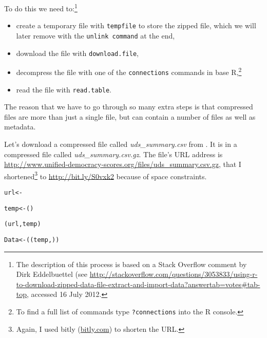 {To do this we need to:\footnote{The description of this process is based on a Stack Overflow comment by Dirk Eddelbuettel (see {\url{http://stackoverflow.com/questions/3053833/using-r-to-download-zipped-data-file-extract-and-import-data?answertab=votes\#tab-top}}, accessed 16 July 2012.}

\begin{itemize}
    \item create a temporary file with {\tt{tempfile}} to store the zipped file, which we will later remove with the {\tt{unlink command}} at the end,
    \item download the file with {\tt{download.file}},
    \item decompress the file with one of the {\tt{connections}} commands in base R,\footnote{To find a full list of commands type {\tt{?connections}} into the R console.}
    \item read the file with {\tt{read.table}}. 
\end{itemize}

The reason that we have to go through so many extra steps is that compressed files are more than just a single file, but can contain a number of files as well as metadata.

Let's download a compressed file called {\emph{uds\_summary.csv}} from \cite{Pemstein2010}. It is in a compressed file called {\emph{uds\_summary.csv.gz}}. The file's URL address is {\url{http://www.unified-democracy-scores.org/files/uds_summary.csv.gz}}, that I shortened\footnote{Again, I used bitly (\url{bitly.com}) to shorten the URL.} to \url{http://bit.ly/S0vxk2} because of space constraints.

\begin{knitrout}
\color{fgcolor}\begin{kframe}
\begin{alltt}
url <- 

temp <- ()

(url, temp)

Data <- ((temp, ))


\end{alltt}
\end{kframe}
\end{knitrout}}
